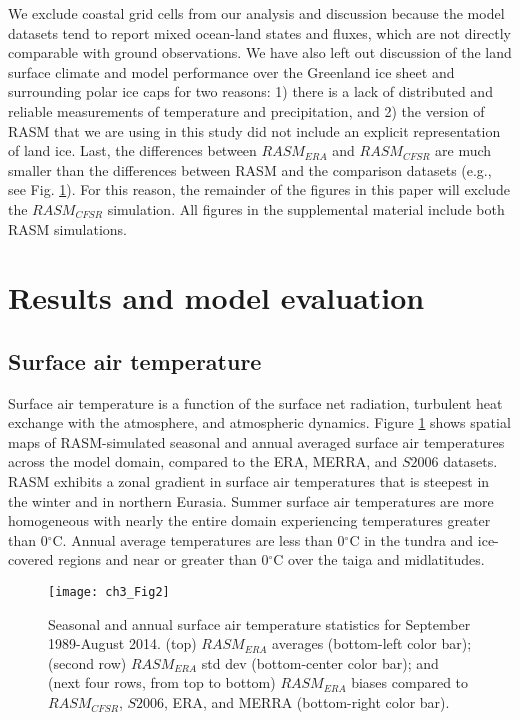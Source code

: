 We exclude coastal grid cells from our analysis and discussion because the model datasets tend to report mixed ocean-land states and fluxes, which are not directly comparable with ground observations.
We have also left out discussion of the land surface climate and model performance over the Greenland ice sheet and surrounding polar ice caps for two reasons: 1) there is a lack of distributed and reliable measurements of temperature and precipitation, and 2) the version of RASM that we are using in this study did not include an explicit representation of land ice.
Last, the differences between $RASM_{ERA}$ and $RASM_{CFSR}$ are much smaller than the differences between RASM and the comparison datasets (e.g., see Fig. \ref{fig:temp_maps}).
For this reason, the remainder of the figures in this paper will exclude the $RASM_{CFSR}$ simulation.
All figures in the supplemental material include both RASM simulations.

\section{Results and model evaluation}
\label{sec:results_ch3}

\subsection{Surface air temperature}

Surface air temperature is a function of the surface net radiation, turbulent heat exchange with the atmosphere, and atmospheric dynamics.
Figure \ref{fig:temp_maps} shows spatial maps of RASM-simulated seasonal and annual averaged surface air temperatures across the model domain, compared to the ERA, MERRA, and $S2006$ datasets.
RASM exhibits a zonal gradient in surface air temperatures that is steepest in the winter and in northern Eurasia.
Summer surface air temperatures are more homogeneous with nearly the entire domain experiencing temperatures greater than 0$^{\circ}$C.
Annual average temperatures are less than 0$^{\circ}$C in the tundra and ice-covered regions and near or greater than 0$^{\circ}$C over the taiga and midlatitudes.

\begin{figure}
  \centering
  \texttt{[image: ch3\_Fig2]}
  \caption{Seasonal and annual surface air temperature statistics for September 1989-August 2014.
  (top) $RASM_{ERA}$ averages (bottom-left color bar); (second row) $RASM_{ERA}$ std dev (bottom-center color bar); and (next four rows, from top to bottom) $RASM_{ERA}$ biases compared to $RASM_{CFSR}$, $S2006$, ERA, and MERRA (bottom-right color bar).}
  \label{fig:temp_maps}
\end{figure}

